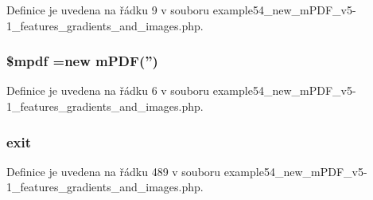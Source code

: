 Definice je uvedena na řádku 9 v souboru example54\-\_\-new\-\_\-m\-P\-D\-F\-\_\-v5-\/1\-\_\-features\-\_\-gradients\-\_\-and\-\_\-images.\-php.

\hypertarget{example54__new__m_p_d_f__v5-1__features__gradients__and__images_8php_ad028f81910d6cbab9b184d2214b3a8f8}{
\subsubsection[{\$mpdf}]{\setlength{\rightskip}{0pt plus 5cm}\$mpdf =new {\bf m\-P\-D\-F}('')}}\label{example54__new__m_p_d_f__v5-1__features__gradients__and__images_8php_ad028f81910d6cbab9b184d2214b3a8f8}


Definice je uvedena na řádku 6 v souboru example54\-\_\-new\-\_\-m\-P\-D\-F\-\_\-v5-\/1\-\_\-features\-\_\-gradients\-\_\-and\-\_\-images.\-php.

\hypertarget{example54__new__m_p_d_f__v5-1__features__gradients__and__images_8php_a6733eb5f605d09eaede9845835d71c4e}{
\subsubsection[{exit}]{\setlength{\rightskip}{0pt plus 5cm}exit}}\label{example54__new__m_p_d_f__v5-1__features__gradients__and__images_8php_a6733eb5f605d09eaede9845835d71c4e}


Definice je uvedena na řádku 489 v souboru example54\-\_\-new\-\_\-m\-P\-D\-F\-\_\-v5-\/1\-\_\-features\-\_\-gradients\-\_\-and\-\_\-images.\-php.

